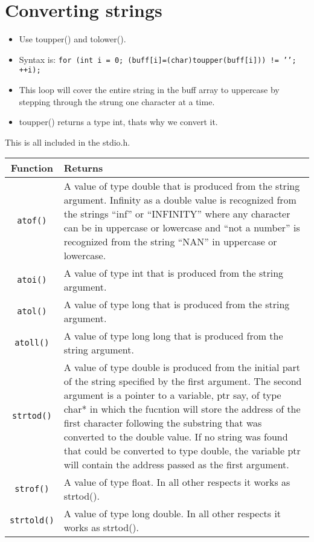 \section{Converting strings}
\begin{itemize}
    \item Use toupper() and tolower(). 
    \item Syntax is: \texttt{for (int i = 0; (buff[i]=(char)toupper(buff[i])) != '\0'; ++i);}
    \item This loop will cover the entire string in the buff array to uppercase by stepping through the strung one character at a time. 
    \item toupper() returns a type int, thats why we convert it. 
\end{itemize}
This is all included in the stdio.h.
\begin{center}
    \begin{tabular}{ |c|p{7cm}| }
        \hline
            Function & Returns \\
        \hline
            \texttt{atof()} & A value of type double that is produced from  the string argument. Infinity as a double value is recognized from the strings ``inf'' or ``INFINITY'' where any character can be in uppercase or lowercase and ``not a number'' is recognized from the string ``NAN'' in uppercase or lowercase. \\  
            \texttt{atoi()} & A value of type int that is produced from the string argument. \\  
            \texttt{atol()} & A value of type long that is produced from the string argument. \\  
            \texttt{atoll()} & A value of type long long that is produced from the string argument.  \\ 
            \texttt{strtod()} & A value of type double is produced from the initial part of the string specified by the first argument. The second argument is a pointer to a variable, ptr say, of type char* in which the fucntion will store the address of the first character following the substring that was converted to the double value. If no string was found that could be converted to type double, the variable ptr will contain the address passed as the first argument. \\ 
            \texttt{strof()} & A value of type float. In all other respects it works as strtod(). \\ 
            \texttt{strtold()} & A value of type long double. In all other respects it works as strtod(). \\ 
        \hline
    \end{tabular}
\end{center}

